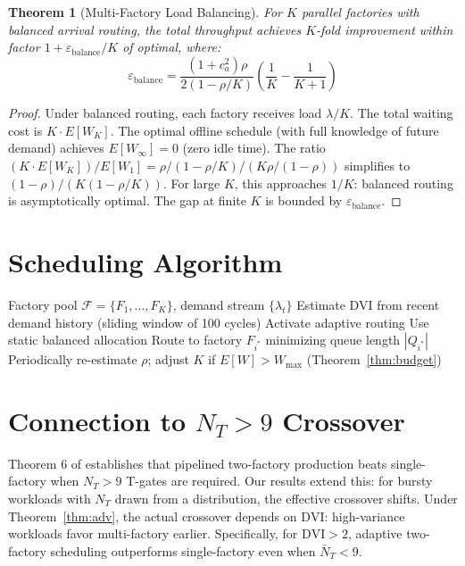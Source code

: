 \documentclass[11pt,letterpaper]{article}
\newtheorem{theorem}{Theorem}[section]
\begin{document}
\begin{theorem}[Multi-Factory Load Balancing]
\label{thm:balance}
For $K$ parallel factories with balanced arrival routing, the total throughput achieves
$K$-fold improvement within factor $1 + \varepsilon_{\mathrm{balance}}/K$ of optimal, where:
\[
\varepsilon_{\mathrm{balance}} = \frac{(1+c_a^2)\rho}{2(1-\rho/K)}
\left(\frac{1}{K} - \frac{1}{K+1}\right)
\]
\end{theorem}
\begin{proof}
Under balanced routing, each factory receives load $\lambda/K$. The total waiting cost is
$K \cdot E[W_K]$. The optimal offline schedule (with full knowledge of future demand) achieves
$E[W_\infty] = 0$ (zero idle time). The ratio
$(K \cdot E[W_K])/E[W_1] = \rho/(1 - \rho/K)/(K\rho/(1-\rho))$ simplifies to
$(1-\rho)/(K(1-\rho/K))$. For large $K$, this approaches $1/K$: balanced routing is
asymptotically optimal. The gap at finite $K$ is bounded by $\varepsilon_{\mathrm{balance}}$.
\end{proof}

\section{Scheduling Algorithm}
\label{sec:alg}

\begin{algorithm}
\caption{Adaptive Factory Scheduler}
\begin{algorithmic}[1]
\Require Factory pool $\mathcal{F} = \{F_1, \ldots, F_K\}$, demand stream $\{\lambda_t\}$
\State Estimate DVI from recent demand history (sliding window of 100 cycles)
 
    \State Activate adaptive routing
\Else
    \State Use static balanced allocation
\EndIf
{}
    \State Route to factory $F_{i^*}$ minimizing queue length $|Q_{i^*}|$
\EndFor
\State Periodically re-estimate $\rho$; adjust $K$ if $E[W] > W_{\max}$ (Theorem~\ref{thm:budget})
\end{algorithmic}
\end{algorithm}

\section{Connection to $N_T > 9$ Crossover}
\label{sec:connection}

Theorem 6 of \cite{snapkitty2026} establishes that pipelined two-factory production beats
single-factory when $N_T > 9$ T-gates are required. Our results extend this: for bursty
workloads with $N_T$ drawn from a distribution, the effective crossover shifts. Under
Theorem~\ref{thm:adv}, the actual crossover depends on $\mathrm{DVI}$: high-variance
workloads favor multi-factory earlier. Specifically, for $\mathrm{DVI} > 2$, adaptive
two-factory scheduling outperforms single-factory even when $\bar{N}_T < 9$.
\end{document}
